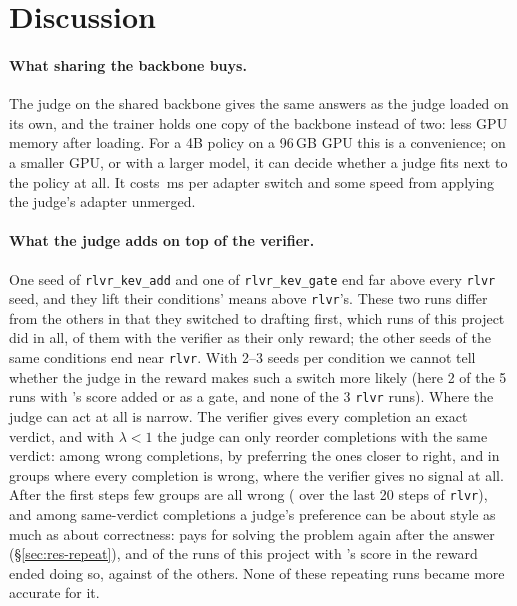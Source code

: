 
\section{Discussion}\label{sec:discussion}

\paragraph{What sharing the backbone buys.} The judge on the shared backbone gives the same answers as the judge
loaded on its own, and the trainer holds one copy of the backbone instead of two:  less GPU memory
after loading. For a 4B policy on a 96\,GB GPU this is a convenience; on a smaller GPU, or with a larger model, it can
decide whether a judge fits next to the policy at all. It costs \,ms per adapter switch and
some speed from applying the judge's adapter unmerged.

\paragraph{What the judge adds on top of the verifier.} One seed of \texttt{rlvr\_kev\_add} and one of
\texttt{rlvr\_kev\_gate} end far above every \texttt{rlvr} seed, and they lift their conditions' means above
\texttt{rlvr}'s. These two runs differ from the others in that they switched to drafting first, which
 runs of this project did in all,  of them with the verifier as their only reward; the other seeds
of the same conditions end near \texttt{rlvr}. With 2--3 seeds per condition we cannot tell whether the judge in the
reward makes such a switch more likely (here 2 of the 5 runs with \kev{}'s score added or as a gate, and none of the 3
\texttt{rlvr} runs). Where the judge can act at all is narrow. The verifier gives every completion an exact verdict,
and with $\lambda<1$ the judge can only reorder completions with the same verdict: among wrong completions, by preferring
the ones closer to right, and in groups where every completion is wrong, where the verifier gives no signal at all.
After the first steps few groups are all wrong ( over the last 20 steps of \texttt{rlvr}), and among
same-verdict completions a judge's preference can be about style as much as about correctness: \kev{} pays for solving
the problem again after the answer (\S\ref{sec:res-repeat}), and  of the  runs of this
project with \kev{}'s score in the reward ended doing so, against  of the  others.
None of these repeating runs became more accurate for it.

